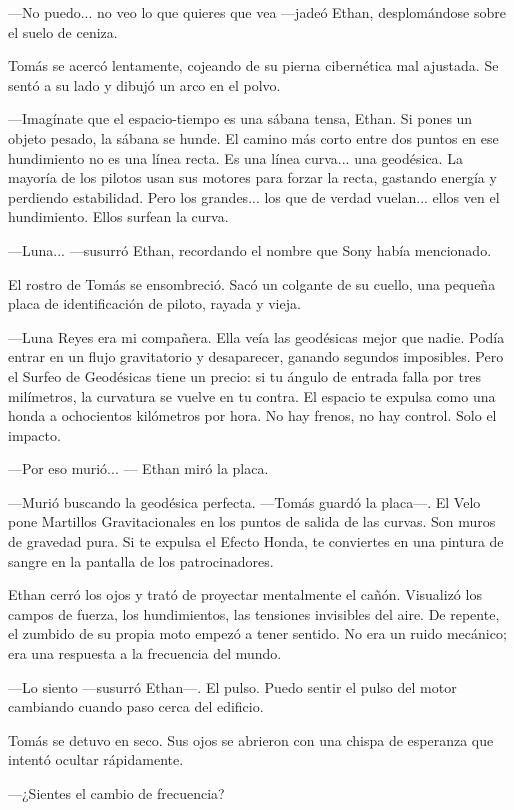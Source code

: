 \documentclass[12pt,a4paper]{book}
\begin{document}
---No puedo... no veo lo que quieres que vea ---jadeó Ethan, desplomándose sobre el suelo de ceniza.

Tomás se acercó lentamente, cojeando de su pierna cibernética mal ajustada. Se sentó a su lado y dibujó un arco en el polvo.

---Imagínate que el espacio-tiempo es una sábana tensa, Ethan. Si pones un objeto pesado, la sábana se hunde. El camino más corto entre dos puntos en ese hundimiento no es una línea recta. Es una línea curva... una geodésica. La mayoría de los pilotos usan sus motores para forzar la recta, gastando energía y perdiendo estabilidad. Pero los grandes... los que de verdad vuelan... ellos ven el hundimiento. Ellos surfean la curva.

---Luna... ---susurró Ethan, recordando el nombre que Sony había mencionado.

El rostro de Tomás se ensombreció. Sacó un colgante de su cuello, una pequeña placa de identificación de piloto, rayada y vieja.

---Luna Reyes era mi compañera. Ella veía las geodésicas mejor que nadie. Podía entrar en un flujo gravitatorio y desaparecer, ganando segundos imposibles. Pero el Surfeo de Geodésicas tiene un precio: si tu ángulo de entrada falla por tres milímetros, la curvatura se vuelve en tu contra. El espacio te expulsa como una honda a ochocientos kilómetros por hora. No hay frenos, no hay control. Solo el impacto.

---Por eso murió... --- Ethan miró la placa.

---Murió buscando la geodésica perfecta. ---Tomás guardó la placa---. El Velo pone Martillos Gravitacionales en los puntos de salida de las curvas. Son muros de gravedad pura. Si te expulsa el Efecto Honda, te conviertes en una pintura de sangre en la pantalla de los patrocinadores.

Ethan cerró los ojos y trató de proyectar mentalmente el cañón. Visualizó los campos de fuerza, los hundimientos, las tensiones invisibles del aire. De repente, el zumbido de su propia moto empezó a tener sentido. No era un ruido mecánico; era una respuesta a la frecuencia del mundo.

---Lo siento ---susurró Ethan---. El pulso. Puedo sentir el pulso del motor cambiando cuando paso cerca del edificio.

Tomás se detuvo en seco. Sus ojos se abrieron con una chispa de esperanza que intentó ocultar rápidamente.

---¿Sientes el cambio de frecuencia?
\end{document}
